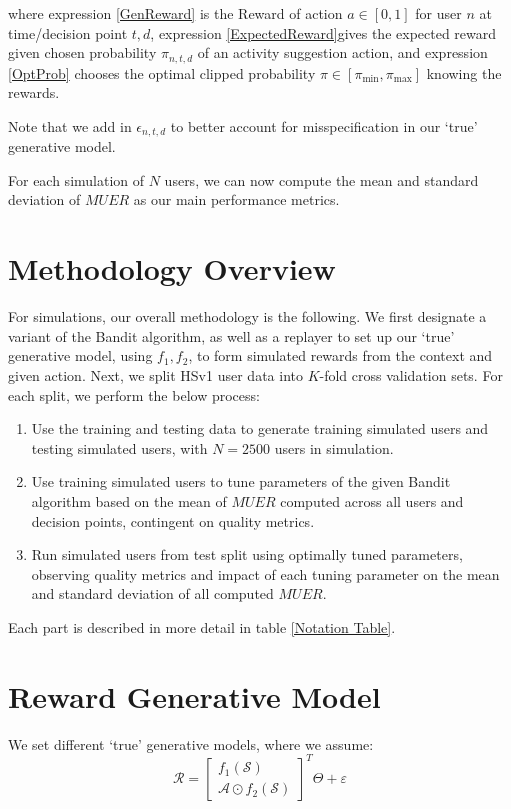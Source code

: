 where expression \ref{GenReward} is the Reward of action $a \in [0,1]$ for user $n$ at time/decision point $t,d$, expression \ref{ExpectedReward}gives the expected reward given chosen probability $\pi_{n,t,d}$ of an activity suggestion action, and expression \ref{OptProb} chooses the optimal clipped probability $\pi \in [\pi_\text{min},\pi_\text{max}]$ knowing the rewards.

Note that we add in $\epsilon_{n,t,d}$ to better account for misspecification in our `true' generative model.


For each simulation of $N$ users, we can now compute the mean and standard deviation of $MUER$ as our main performance metrics. \\

\section{Methodology Overview}

For simulations, our overall methodology is the following.  We first designate a variant of the Bandit algorithm, as well as a replayer to set up our `true' generative model, using $f_1,f_2$, to form simulated rewards from the context and given action.  Next, we split HSv1 user data into $K$-fold cross validation sets.  For each split, we perform the below process:

\begin{enumerate}
	\item Use the training and testing data to generate training simulated users and testing simulated users, with $N = 2500$ users in simulation.  
	\item Use training simulated users to tune parameters of the given Bandit algorithm based on the mean of $MUER$ computed across all users and decision points, contingent on quality metrics.
	\item Run simulated users from test split using optimally tuned parameters, observing quality metrics and impact of each tuning parameter on the mean and standard deviation of all computed $MUER$.
\end{enumerate}

Each part is described in more detail in table \ref{Notation Table}.


\section{Reward Generative Model}

We set different `true' generative models, where we assume:
\begin{equation}
\label{True Generative Model}
\mathcal{R} = \begin{bmatrix}f_1(\mathcal{S}) \\
\mathcal{A} \odot f_2(\mathcal{S})
\end{bmatrix}^T \Theta + \varepsilon
\end{equation}

